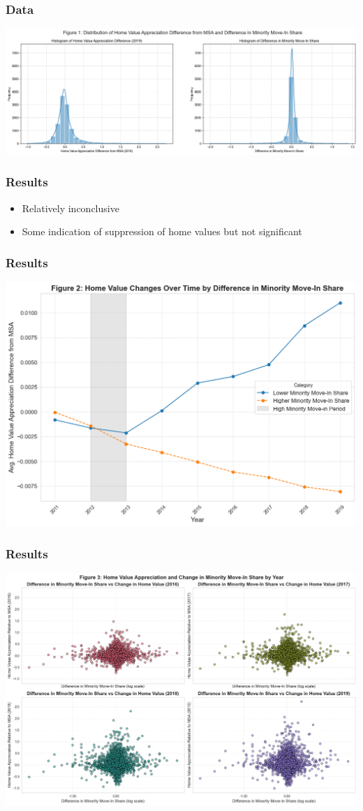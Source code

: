\documentclass{beamer}
\begin{document}
\begin{frame}
\frametitle{Data}
    \includegraphics[width=\textwidth]{project_files/project_40_0.png}
\end{frame}
\begin{frame}
\frametitle{Results}
\begin{itemize}
    \item Relatively inconclusive
    \item Some indication of suppression of home values but not significant
\end{itemize}
\end{frame}
\begin{frame}
    \frametitle{Results}
    \includegraphics[width=\textwidth]{project_files/project_43_1.png}
\end{frame}
\begin{frame}
    \frametitle{Results}
    \includegraphics[width=\textwidth]{project_files/project_46_0.png}
\end{frame}
\end{document}
